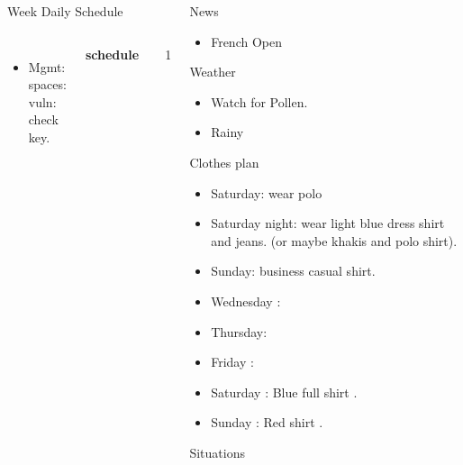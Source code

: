 \documentclass[serif, mathserif, final]{beamer}
\begin{document}
\begin{frame}{}
\begin{columns}
\begin{column}{0.50\linewidth}
\begin{block}{Week Daily Schedule}
\begin{columns}
\begin{itemize}
    \item \tiny Mgmt: spaces: vuln: check key. 
  \end{itemize}
  \textbf{\small schedule}\\
  \begin{enumerate} 
    \tiny \item \tiny 
  \end{enumerate} 
    \end{columns}
  \end{block}
\end{column}%

\begin{column}{0.20\linewidth}
  \begin{block}{News}
    \begin{itemize} 
      \tiny \item \tiny French Open
    \end{itemize}
  \end{block}
  \begin{block}{Weather} 
    \begin{itemize}
      \tiny \item \tiny Watch for Pollen.
    \item \tiny Rainy 
    \end{itemize}
  \end{block} 
  \begin{block}{Clothes plan} 
    \begin{itemize} 
      \tiny \item \tiny Saturday: wear polo 
    \item \tiny Saturday night: wear light blue dress shirt and jeans. (or maybe khakis and polo shirt). 
    \item \tiny Sunday: business casual shirt. 
    \item \tiny Wednesday : 
    \item \tiny Thursday: 
    \item \tiny Friday : 
    \item \tiny Saturday : Blue full shirt . 
    \item \tiny Sunday : Red shirt .
    \end{itemize} 
  \end{block}

  \begin{block}{Situations}
    \begin{itemize}
    


\end{itemize}
\end{block}
\end{column}
\end{columns}
\end{frame}
\end{document}
